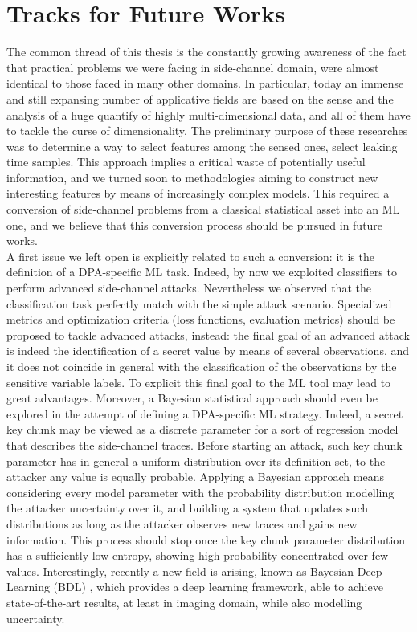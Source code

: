 \section{Tracks for Future Works}

The common thread of this thesis is the constantly growing awareness of the fact that practical problems we were facing in side-channel domain, were almost identical to those faced in many other domains. In particular, today an immense and still expansing number of applicative fields are based on the sense and the analysis of a huge quantify of highly multi-dimensional data, and all of them have to tackle the curse of dimensionality. The preliminary purpose of these researches was to determine a way to select features among the sensed ones, \ie select leaking time samples. This approach implies a critical waste of potentially useful information, and we turned soon  to methodologies aiming to construct new interesting features by means of increasingly complex models. This required a conversion of side-channel problems from a classical statistical asset into an ML one, and we believe that this conversion process should be pursued in future works.\\

A first issue we left open is explicitly related to such a conversion: it is the definition of a DPA-specific ML task. Indeed, by now we exploited classifiers to perform advanced side-channel attacks. Nevertheless we observed that the classification task perfectly match with the simple attack scenario. Specialized metrics and optimization criteria (\eg loss functions, evaluation metrics) should be proposed to tackle advanced attacks, instead: the final goal of an advanced attack is indeed the identification of a secret value by means of several observations, and it does not coincide in general with the classification of the observations by the sensitive variable labels. To explicit this final goal to the ML tool may lead to great advantages. Moreover, a Bayesian statistical approach should even be explored in the attempt of defining a DPA-specific ML strategy. Indeed, a secret key chunk may be viewed as a discrete parameter for a sort of regression model that describes the side-channel traces. Before starting an attack, such key chunk parameter has  in general a uniform distribution over its definition set, \ie to the attacker any value is equally probable. Applying a Bayesian approach means considering every model parameter with the probability distribution modelling the attacker uncertainty over it, and building a system that updates such distributions as long as the attacker observes new traces and gains new information. This process should stop once the key chunk parameter distribution has a sufficiently low entropy, showing high probability concentrated over few values. Interestingly, recently a new field is arising, known as Bayesian Deep Learning (BDL) \cite{gal2016uncertainty}, which provides a deep learning framework, able to achieve state-of-the-art results, at least in imaging domain, while also modelling uncertainty. \\


